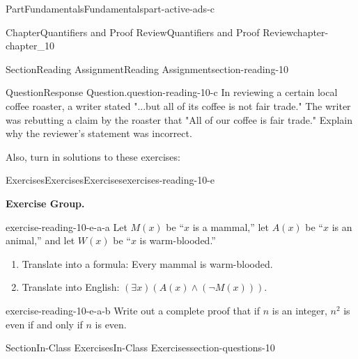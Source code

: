 \documentclass[oneside,10pt,]{book}
\numberwithin{equation}{section}
\begin{document}
\begin{partptx}{Part}{Fundamentals}{}{Fundamentals}{}{}{part-active-ads-c}
\begin{chapterptx}{Chapter}{Quantifiers and Proof Review}{}{Quantifiers and Proof Review}{}{}{chapter-chapter_10}
\begin{sectionptx}{Section}{Reading Assignment}{}{Reading Assignment}{}{}{section-reading-10}
\begin{question}{Question}{Response Question.}{question-reading-10-c}%
In reviewing a certain local coffee roaster, a writer stated  "...but all of its coffee is not fair trade." The writer was rebutting a claim by the roaster that "All of our coffee is fair trade."  Explain why the reviewer's statement was incorrect.%
\end{question}
Also, turn in solutions to these exercises:%
%
%
\typeout{************************************************}
\typeout{************************************************}
%
\begin{exercises-subsection-numberless}{Exercises}{Exercises}{}{Exercises}{}{}{exercises-reading-10-e}
\par\medskip\noindent%
\textbf{Exercise Group.}\space\space%
\begin{exercisegroup}
\begin{divisionexerciseeg}{1}{}{}{exercise-reading-10-e-a-a}%
Let \(M(x)\) be ``\(x\) is a mammal,'' let \(A(x)\) be ``\(x\) is an animal,'' and let \(W(x)\) be ``\(x\) is warm-blooded.''%
\par
%
\begin{enumerate}[label=(\alph*)]
\item{}Translate into a formula: Every mammal is warm-blooded.%
\item{}Translate into English: \((\exists x)(A(x) \land  (\neg M(x)))\).%
\end{enumerate}
%
\end{divisionexerciseeg}%
\begin{divisionexerciseeg}{2}{}{}{exercise-reading-10-e-a-b}%
Write out a complete proof that if \(n\) is an integer, \(n^2\) is even if and only if \(n\) is even.%
\end{divisionexerciseeg}%
\end{exercisegroup}
\par\medskip\noindent
\end{exercises-subsection-numberless}
\end{sectionptx}
%
%
\typeout{************************************************}
\typeout{************************************************}
%
\begin{sectionptx}{Section}{In-Class Exercises}{}{In-Class Exercises}{}{}{section-questions-10}
%
%
%
\typeout{************************************************}
\typeout{************************************************}

\end{sectionptx}
\end{chapterptx}
\end{partptx}
\end{document}
